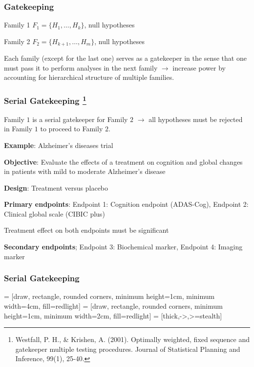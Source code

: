 \documentclass[xcolor={pdftex,dvipsnames,table}]{beamer}
\newcommand{\rbf}[1]{\textcolor{redUnipd}{ #1}}
\begin{document}
\begin{frame}
\frametitle{Gatekeeping}
\rbf{Family 1}
$F_1 = \{H_1, \dots, H_k\}$, null hypotheses

\rbf{Family 2}
$F_2 = \{H_{k+1}, \dots, H_m\}$, null hypotheses
\bigskip

Each family (except for the last one) serves as a gatekeeper in the sense that one must pass it to perform analyses in the next family $\rightarrow$ increase power by accounting for \rbf{hierarchical} structure of multiple families.
\end{frame}

\begin{frame}
\frametitle{Serial Gatekeeping \footnote{Westfall, P. H., & Krishen, A. (2001). Optimally weighted, fixed sequence and gatekeeper multiple testing procedures. Journal of Statistical Planning and Inference, 99(1), 25-40.}}

Family $1$ is a \rbf{serial gatekeeper} for Family $2$ $\rightarrow$ all hypotheses must be rejected in Family $1$ to proceed to Family $2$.

\bigskip
\rbf{\textbf{Example}}: Alzheimer's diseases trial

\textbf{Objective}: Evaluate the effects of a treatment on cognition
and global changes in patients with mild to moderate Alzheimer's disease

\textbf{Design}: Treatment versus placebo

\textbf{Primary endpoints}: Endpoint 1: Cognition endpoint (ADAS-Cog), Endpoint 2: Clinical global scale (CIBIC plus)

Treatment effect on both endpoints must be significant

\textbf{Secondary endpoints}; Endpoint 3: Biochemical marker, Endpoint 4: Imaging marker
\end{frame}

\begin{frame}
\frametitle{Serial Gatekeeping}
 = [draw, rectangle, rounded corners, minimum height=1cm, minimum width=4cm, fill=redlight]
 = [draw, rectangle, rounded corners, minimum height=1cm, minimum width=2cm, fill=redlight]
 = [thick,->,>=stealth]

\begin{figure}
\centering

\end{figure}

\end{frame}
\end{document}
